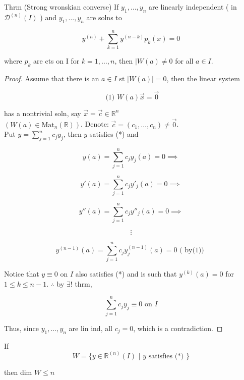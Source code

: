 \begin{theorem}
  Thrm (Strong wronskian converse) If \( y_1, \dots , y_n \) are linearly
  independent ( in \( \mathscr{D}^{(n)} (I) \) ) and \( y_1, \dots , y_n
  \) are solns to 

  \hrulefill

  \[ y^{(n)} + \sum_{k=1}^n y^{(n-k)} p_k(x) = 0 \]

  where \( p_k \) are cts on I for \( k=1, \dots , n \), then \( |W(a)
  \neq 0  \) for all \( a \in I \). 
\end{theorem}

\begin{proof}
  Assume that there is an \( a \in I \) st \( |W(a)| = 0 \), then
  the linear system 

  \[ \text{ (1) } W(a) \vec{x} = \vec{0} \]

  has a nontrivial soln, say \( \vec{x} = \vec{c} \in \mathbb{R}^n \)\\
  \( (W(a) \in \text{Mat}_n( \mathbb{R})) \). Denote: \( \vec{c} = (c_1,
  \dots , c_n) \neq \vec{0} \). \\[5mm]

  Put \( y = \sum_{j=1}^n c_j y_j \), then \( y \) satisfies (*) and %

  \[  y(a) = \sum_{j=1}^n c_j y_j(a) = 0  \implies\]

  \[ y'(a) = \sum_{j=1}^n c_j y'_j(a) = 0 \implies\]

  \[  y''(a) = \sum_{j=1}^n c_j y''_j(a) = 0  \implies\]

  \[ \vdots \]

  \[  y^{(n-1)}(a) = \sum_{j=1}^n c_j y^{(n-1)}_j(a) = 0 \text{ ( by(1)) } \]

  Notice that \( y \equiv 0 \) on \( I  \) also satisfies (*) and is such
  that \( y^{(k)}(a) = 0 \) for \( 1 \leq k \leq n-1 \). \( \therefore \)
  by \( \exists \)! thrm, 

  \[ \sum_{j=1}^n c_j y_j \equiv 0 \text{ on } I \]

  Thus, since \( y_1, \dots , y_n \) are lin ind, all \( c_j = 0 \), which
  is a contradiction.  
\end{proof}

\begin{theorem}
  If
  \[ W = \{ y \in \mathbb{R}^{(n)}(I) \text{ | } y \text{ satisfies (*) }  \}
  \]

  then dim \( W \leq n  \)
\end{theorem}

